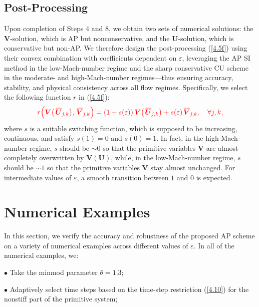 \documentclass[A4paper,12pt,twoside]{article}
\numberwithin{equation}{section}
\numberwithin{figure}{section}
\numberwithin{table}{section}
\newcommand{\ve}{\varepsilon}
\newcommand\eref[1]{(\ref{#1})}
\newcommand*\xbar[1]{%
  \hbox{%
    \vbox{%
      \hrule height 0.5pt %
      \kern0.4ex%
      \hbox{%
        \kern-0.05em%
        \ensuremath{#1}%
        \kern-0.00em%
      }%
    }%
  }%
}
\newcommand{\lore}[1]{{\leavevmode\color{red} #1}}
\begin{document}

\subsection{Post-Processing}\label{sec43}
Upon 
completion of \lore{Steps 4 and 8}, we obtain two sets of numerical solutions: %
the $\bm V$-solution, which is AP but nonconservative, and the $\bm U$-solution, which is conservative but non-AP. We therefore design %
\lore{the} post-processing \eref{4.5f} using their
convex combination with coefficients %
\lore{dependent on} $\ve$, leveraging the AP SI method in the low-Mach-number regime and the sharp
conservative CU scheme in the moderate- and high-Mach-number regimes---thus ensuring accuracy, stability, and physical consistency across
all flow regimes. Specifically, we select the following function $r$ in \eref{4.5f}:
\begin{equation}
\lore{r\Big(\bm V\big(\,\xbar{\bm U}_{j,k}\big),\,\xbar{\bm V}_{j,k}\Big)=
(1-s(\ve))\,\bm V\big(\,\xbar{\bm U}_{j,k}\big)+s(\ve)\,\xbar{\bm V}_{j,k},\quad\forall j,k,}
\label{3.46}
\end{equation}
where $s$ is a suitable switching function, which is supposed to be increasing, continuous, and satisfy $s(1)=0$ and $s(0)=1$. %
\lore{In fact,} in the high-Mach-number regime, $s$ should be $\sim0$ so that the primitive variables \lore{$\bm V$} are almost completely overwritten by
\lore{$\bm V(\bm U)$}, while, in the low-Mach-number regime, $s$ should be $\sim1$ so that the primitive variables \lore{$\bm V$} stay almost
unchanged. For intermediate values of $\ve$, a smooth transition between $1$ and $0$ is expected.




\section{Numerical Examples}\label{sec6}
In this section, we verify the accuracy and robustness of the proposed AP scheme on a variety of numerical examples across different values 
of $\ve$. In all of the numerical examples, we:

\smallskip
\noindent
$\bullet$ Take the minmod parameter $\theta=1.3$;

\smallskip
\noindent
$\bullet$ Adaptively select time steps based on the time-step restriction \eref{4.10} for the nonstiff part of the primitive system;
\end{document}
